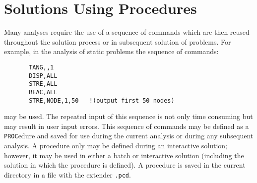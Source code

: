 \section{Solutions Using Procedures}
\label{proc}

Many analyses require the use of a sequence of commands which 
are then reused throughout the solution process or in subsequent
solution of problems.  For example, in
the analysis of static problems the sequence of commands:
\begin{verbatim}
       TANG,,1
       DISP,ALL
       STRE,ALL
       REAC,ALL
       STRE,NODE,1,50   !(output first 50 nodes)
\end{verbatim}
may be used.  The repeated input of this sequence is not only time
consuming but may result in user input errors.  This sequence of
commands may be defined as a {\tt PROC}edure and saved for use during
the current analysis or during any subsequent analysis.  A procedure
only may be defined during an interactive solution; however, it may
be used in either a batch or interactive solution (including
the solution in which the procedure is defined).  A procedure is 
saved in the current directory in a file with the extender {\tt .pcd}.

